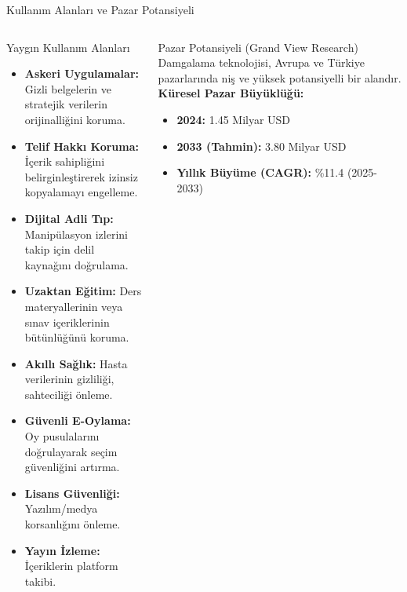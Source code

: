 \documentclass[aspectratio=169,xcolor={dvipsnames}]{beamer}
\begin{document}
\begin{frame}{Kullanım Alanları ve Pazar Potansiyeli}
\begin{columns}
\begin{block}{Yaygın Kullanım Alanları}
\tiny
\begin{itemize}
\item \textbf{Askeri Uygulamalar:} Gizli belgelerin ve stratejik verilerin orijinalliğini koruma.
\item \textbf{Telif Hakkı Koruma:} İçerik sahipliğini belirginleştirerek izinsiz kopyalamayı engelleme.
\item \textbf{Dijital Adli Tıp:} Manipülasyon izlerini takip için delil kaynağını doğrulama.
\item \textbf{Uzaktan Eğitim:} Ders materyallerinin veya sınav içeriklerinin bütünlüğünü koruma.
\item \textbf{Akıllı Sağlık:} Hasta verilerinin gizliliği, sahteciliği önleme.
\item \textbf{Güvenli E-Oylama:} Oy pusulalarını doğrulayarak seçim güvenliğini artırma.
\item \textbf{Lisans Güvenliği:} Yazılım/medya korsanlığını önleme.
\item \textbf{Yayın İzleme:} İçeriklerin platform takibi.
\end{itemize}
\end{block}
\begin{alertblock}{Pazar Potansiyeli (Grand View Research)}
Damgalama teknolojisi, Avrupa ve Türkiye pazarlarında niş ve yüksek potansiyelli bir alandır.
\vspace{0.3cm}
\textbf{Küresel Pazar Büyüklüğü:}
\begin{itemize}
\item \textbf{2024:} 1.45 Milyar USD
\item \textbf{2033 (Tahmin):} 3.80 Milyar USD
\item \textbf{Yıllık Büyüme (CAGR):} \%11.4 (2025-2033)
\end{itemize}
\end{alertblock}
\end{columns}
\end{frame}
\end{document}
